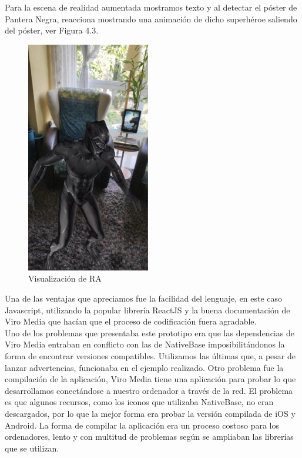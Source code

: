Para la escena de realidad aumentada mostramos texto y al detectar el póster de Pantera Negra,
reacciona mostrando una animación de dicho superhéroe saliendo del póster, ver Figura 4.3.
 
\begin{figure}[H]
    \centering
    \includegraphics[height=4in]{figures/chapter-3/viromedia/blackpanther.png}
    \caption{Visualización de RA}
\end{figure}
\newpage
Una de las ventajas que apreciamos fue la facilidad del lenguaje, en este caso Javascript,
 utilizando la popular librería ReactJS y la buena documentación de Viro Media
 que hacían que el proceso de codificación fuera agradable.\\

Uno de los problemas que presentaba este prototipo era que las dependencias de Viro Media entraban en conflicto con las de NativeBase
imposibilitándonos la forma de encontrar versiones compatibles. Utilizamos las últimas que, a pesar de lanzar
 advertencias, funcionaba en el ejemplo realizado.
Otro problema fue la compilación de la aplicación, Viro Media tiene una aplicación para probar lo
 que desarrollamos conectándose a nuestro ordenador a través de la red. El problema es
 que algunos recursos, como los iconos que utilizaba NativeBase, no eran descargados, por lo que la
 mejor forma era probar la versión compilada de iOS y Android. La forma de compilar
 la aplicación era un proceso costoso para los ordenadores, lento y con multitud de problemas según
 se ampliaban las librerías que se utilizan.\\

